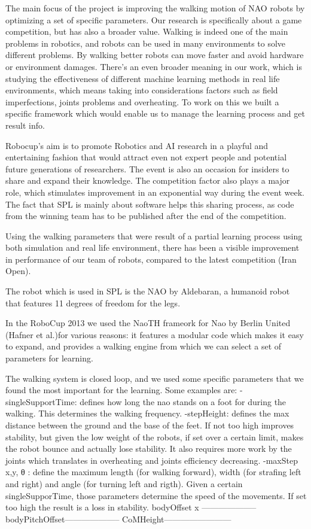 The main focus of the project is improving the walking motion of NAO robots by optimizing a set of specific parameters. Our research is specifically about a game competition, but has also a broader value. Walking is indeed one of the main problems in robotics, and robots can be used in many environments to solve different problems. By walking better robots can move faster and avoid hardware or environment damages. There's an even broader meaning in our work, which is studying the effectiveness of different machine learning methods in real life environments, which means taking into considerations factors such as field imperfections, joints problems and overheating. To work on this we built a specific framework which would enable us to manage the learning process and get result info. 


Robocup's aim is to promote Robotics and AI research in a playful and entertaining fashion that would attract even not expert people and potential future generations of researchers. The event is also an occasion for insiders to share and expand their knowledge. The competition factor also plays a major role, which stimulates improvement in an exponential way during the event week. The fact that SPL is mainly about software helps this sharing process, as code from the winning team has to be published after the end of the competition. 

Using the walking parameters that were result of a partial learning process using both simulation and real life environment, there has been a visible improvement in performance of our team of robots, compared to the latest competition (Iran Open). 
 
The robot which is used in SPL is the NAO by Aldebaran, a humanoid robot that features 11 degrees of freedom for the legs.

In the RoboCup 2013 we used the NaoTH frameork for Nao by Berlin United (Hafner et al.)for various reasons: it features a modular code which makes it easy to expand, and provides a walking engine from which we can select a set of parameters for learning. 

The walking system is closed loop, and we used some specific parameters that we found the most important for the learning.
Some examples are:
-singleSupportTime: defines how long the nao stands on a foot for during the walking. This determines the walking frequency.
-stepHeight: defines the max distance between the ground and the base of the feet. If not too high improves stability, but given the low weight of the robots, if set over a certain limit, makes the robot bounce and actually lose stability. It also requires more work by the joints which translates in overheating and joints efficiency decreasing. 
-maxStep x,y, θ : define the maximum length (for walking forward), width (for strafing left and right) and angle (for turning left and rigth). Given a certain singleSupporTime, those parameters determine the speed of the movements. If set too high the result is a loss in stability.
bodyOffset x --------------------
bodyPitchOffset--------------------
CoMHeight------------------------

